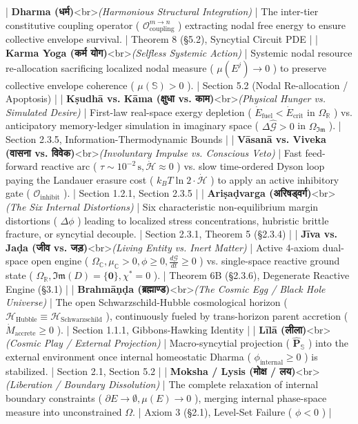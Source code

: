 \documentclass[11pt,a4paper]{article}
\theoremstyle{definition}
\theoremstyle{remark}
\begin{document}
| \textbf{Dharma (धर्म)}<br>\textit{(Harmonious Structural Integration)} | The inter-tier constitutive coupling operator ( $\mathcal{O}_{\text{coupling}}^{m \to n}$ ) extracting nodal free energy to ensure collective envelope survival. | Theorem 8 (\S 5.2), Syncytial Circuit PDE |
| \textbf{Karma Yoga (कर्म योग)}<br>\textit{(Selfless Systemic Action)} | Systemic nodal resource re-allocation sacrificing localized nodal measure ( $\mu(E^j) \to 0$ ) to preserve collective envelope coherence ( $\mu(\mathbb{S}) > 0$ ). | Section 5.2 (Nodal Re-allocation / Apoptosis) |
| \textbf{Kṣudhā vs. Kāma (क्षुधा vs. काम)}<br>\textit{(Physical Hunger vs. Simulated Desire)} | First-law real-space exergy depletion ( $\dot{E}_{\text{fuel}} < \dot{E}_{\text{crit}}$ in $\Omega_{\mathbb{R}}$ ) vs. anticipatory memory-ledger simulation in imaginary space ( $\Delta \hat{\mathcal{G}} > 0$ in $\Omega_{\mathfrak{Im}}$ ). | Section 2.3.5, Information-Thermodynamic Bounds |
| \textbf{Vāsanā vs. Viveka (वासना vs. विवेक)}<br>\textit{(Involuntary Impulse vs. Conscious Veto)} | Fast feed-forward reactive arc ( $\tau \sim 10^{-2}\,\mathrm{s}, \dot{\mathcal{H}} \approx 0$ ) vs. slow time-ordered Dyson loop paying the Landauer erasure cost ( $k_B T \ln 2 \cdot \dot{\mathcal{H}}$ ) to apply an active inhibitory gate ( $\mathcal{O}_{\text{inhibit}}$ ). | Section 1.2.1, Section 2.3.5 |
| \textbf{Ariṣaḍvarga (अरिषड्वर्ग)}<br>\textit{(The Six Internal Distortions)} | Six characteristic non-equilibrium margin distortions ( $\Delta \phi$ ) leading to localized stress concentrations, hubristic brittle fracture, or syncytial decouple. | Section 2.3.1, Theorem 5 (\S 2.3.4) |
| \textbf{Jīva vs. Jaḍa (जीव vs. जड़)}<br>\textit{(Living Entity vs. Inert Matter)} | Active 4-axiom dual-space open engine ( $\Omega_{\mathbb{C}}, \mu_{\mathbb{C}} > 0, \phi \ge 0, \frac{d\mathcal{G}}{dt} \ge 0$ ) vs. single-space reactive ground state ( $\Omega_{\mathbb{R}}, \mathfrak{Im}(D) = \{\mathbf{0}\}, \chi^* = 0$ ). | Theorem 6B (\S 2.3.6), Degenerate Reactive Engine (\S 3.1) |
| \textbf{Brahmāṇḍa (ब्रह्माण्ड)}<br>\textit{(The Cosmic Egg / Black Hole Universe)} | The open Schwarzschild-Hubble cosmological horizon ( $\mathcal{H}_{\text{Hubble}} \equiv \mathcal{H}_{\text{Schwarzschild}}$ ), continuously fueled by trans-horizon parent accretion ( $\dot{M}_{\text{accrete}} \ge 0$ ). | Section 1.1.1, Gibbons-Hawking Identity |
| \textbf{Līlā (लीला)}<br>\textit{(Cosmic Play / External Projection)} | Macro-syncytial projection ( $\hat{\mathbf{P}}_{\mathbb{S}}$ ) into the external environment once internal homeostatic Dharma ( $\phi_{\text{internal}} \ge 0$ ) is stabilized. | Section 2.1, Section 5.2 |
| \textbf{Moksha / Lysis (मोक्ष / लय)}<br>\textit{(Liberation / Boundary Dissolution)} | The complete relaxation of internal boundary constraints ( $\partial E \to \emptyset, \mu(E) \to 0$ ), merging internal phase-space measure into unconstrained $\Omega$. | Axiom 3 (\S 2.1), Level-Set Failure ( $\phi < 0$ ) |
\end{document}
